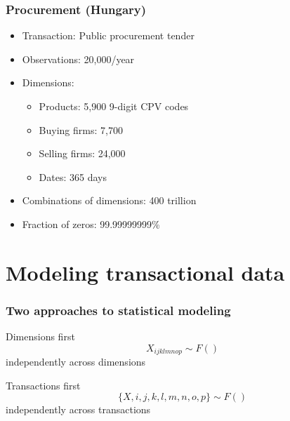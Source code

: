 \documentclass[compress,mathserif]{beamer}
\begin{document}
\begin{frame}\frametitle{Procurement (Hungary)}\hypertarget{Procurement (Hungary)}{}
\begin{itemize}
\item Transaction: Public procurement tender

\item Observations: 20,000/year

\item Dimensions:
\begin{itemize}
\item Products: 5,900 9-digit CPV codes

\item Buying firms: 7,700

\item Selling firms: 24,000

\item Dates: 365 days
\end{itemize}

\item Combinations of dimensions: 400 trillion

\item Fraction of zeros: 99.99999999\%










\end{itemize}
\end{frame}







\section{Modeling transactional data}\hypertarget{Modeling transactional data}{}
\begin{frame}\frametitle{Two approaches to statistical modeling}\hypertarget{Two approaches to statistical modeling}{}
\begin{block}{Dimensions first}\hypertarget{Dimensions first}{}
\[
X_{ijklmnop} \sim F()
\]
independently across dimensions
\pause


\end{block}
\begin{block}{Transactions first}\hypertarget{Transactions first}{}
\[
\{X,i,j,k,l,m,n,o,p\} \sim F()
\]
independently across transactions


\end{block}
\end{frame}
\end{document}
